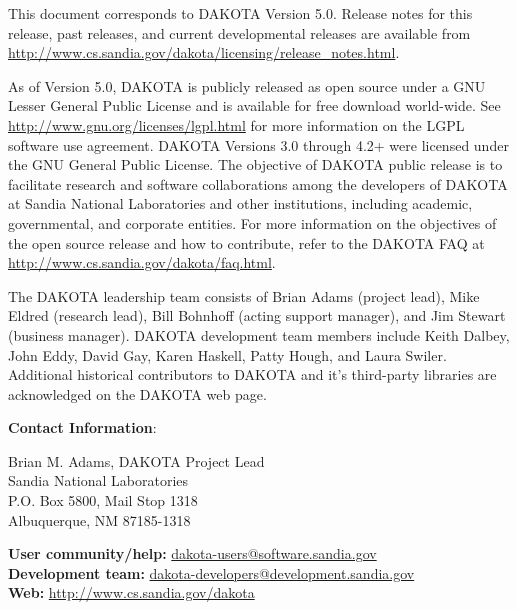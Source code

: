 This document corresponds to DAKOTA Version 5.0.  Release notes for
this release, past releases, and current developmental releases are
available from
\url{http://www.cs.sandia.gov/dakota/licensing/release_notes.html}.

As of Version 5.0, DAKOTA is publicly released as open source under a
GNU Lesser General Public License and is available for free download
world-wide.  See \url{http://www.gnu.org/licenses/lgpl.html} for more
information on the LGPL software use agreement.  DAKOTA Versions 3.0
through 4.2+ were licensed under the GNU General Public License.  The
objective of DAKOTA public release is to facilitate research and
software collaborations among the developers of DAKOTA at Sandia
National Laboratories and other institutions, including academic,
governmental, and corporate entities. For more information on the
objectives of the open source release and how to contribute, refer to
the DAKOTA FAQ at \url{http://www.cs.sandia.gov/dakota/faq.html}.

The DAKOTA leadership team consists of Brian Adams (project lead),
Mike Eldred (research lead), Bill Bohnhoff (acting support manager),
and Jim Stewart (business manager).  DAKOTA development team members
include Keith Dalbey, John Eddy, David Gay, Karen Haskell, Patty
Hough, and Laura Swiler.  Additional historical contributors to DAKOTA
and it's third-party libraries are acknowledged on the DAKOTA web
page.

\textbf{Contact Information}:

{\small Brian M. Adams, DAKOTA Project Lead}\\
{\small Sandia National Laboratories}\\
{\small P.O. Box 5800, Mail Stop 1318}\\
{\small Albuquerque, NM 87185-1318}

{\small {\bf User community/help:} \href{mailto:dakota-users@software.sandia.gov}{dakota-users@software.sandia.gov}}\\
{\small {\bf Development team:} \href{mailto:dakota-developers@development.sandia.gov}{dakota-developers@development.sandia.gov}}\\
{\small {\bf Web:} \url{http://www.cs.sandia.gov/dakota}}
